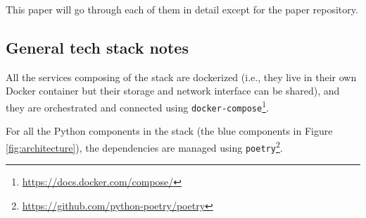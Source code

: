 This paper will go through each of them in detail except for the paper repository.






















\subsection{General tech stack notes} \label{ssec:general-tech-stack-notes}

All the services composing of the stack are dockerized (i.e., they live in their own Docker container but their storage and network interface can be shared), and they are orchestrated and connected using \texttt{docker-compose}\footnote{\url{https://docs.docker.com/compose/}}.

For all the Python components in the stack (the blue components in Figure \ref{fig:architecture}), the dependencies are managed using \texttt{poetry}\footnote{\url{https://github.com/python-poetry/poetry}}.

